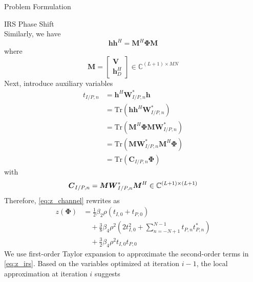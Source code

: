 \documentclass{IEEEtran}
\begin{document}
\begin{section}{Problem Formulation}
\begin{subsection}{IRS Phase Shift}
\begin{equation}
		\end{equation}
		Similarly, we have
		\begin{equation}
			\boldsymbol{h}\boldsymbol{h}^H=\boldsymbol{M}^H\boldsymbol{\Phi}\boldsymbol{M}
		\end{equation}
		where
		\begin{equation}\label{eq:M}
			\boldsymbol{M}=
			\begin{bmatrix}
				\boldsymbol{V} \\
				\boldsymbol{h}_D^H
			\end{bmatrix} \in \mathbb{C}^{(L+1) \times MN}
		\end{equation}
		Next, introduce auxiliary variables
		\begin{equation}\label{eq:t}
			\begin{split}
				t_{I/P,n}
				&=\boldsymbol{h}^H\boldsymbol{W}_{I/P,n}^*\boldsymbol{h}\\
				&=\mathrm{Tr}(\boldsymbol{h}\boldsymbol{h}^H\boldsymbol{W}_{I/P,n}^*)\\
				&=\mathrm{Tr}(\boldsymbol{M}^H\boldsymbol{\Phi}\boldsymbol{M}\boldsymbol{W}_{I/P,n}^*)\\
				&=\mathrm{Tr}(\boldsymbol{M}\boldsymbol{W}_{I/P,n}^*\boldsymbol{M}^H\boldsymbol{\Phi})\\
				&=\mathrm{Tr}(\boldsymbol{C}_{I/P,n}\boldsymbol{\Phi})
			\end{split}
		\end{equation}
		with
		\begin{equation}\label{eq:C_{I/P,n}}
			\boldsymbol{C}_{I/P,n}=\boldsymbol{M}\boldsymbol{W}_{I/P,n}^*\boldsymbol{M}^H \in \mathbb{C}^{(L+1)\times(L+1)}
		\end{equation}
		Therefore, \ref{eq:z_channel} rewrites as
		\begin{equation}\label{eq:z_irs}
			\begin{split}
				z(\boldsymbol{\Phi})
				&=\frac{1}{2}{\beta_2}{\rho}(t_{I,0}+t_{P,0})\\
				&\quad+\frac{3}{8}{\beta_4}{\rho^2} \left(2t_{I,0}^2 + \sum_{n=-N+1}^{N-1}{t_{P,n}t_{P,n}^*}\right)\\
				&\quad+\frac{3}{2}{\beta_4}{\rho^2}t_{I,0}t_{P,0}
			\end{split}
		\end{equation}
		We use first-order Taylor expansion to approximate the second-order terms in \ref{eq:z_irs}. Based on the variables optimized at iteration $i - 1$, the local approximation at iteration $i$ suggests \cite{Adali2010}
		\begin{align}

\end{align}
\end{subsection}
\end{section}
\end{document}
